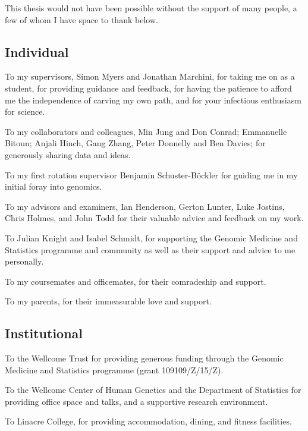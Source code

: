
This thesis would not have been possible without the support of many people, a few of whom I have space to thank below.

\subsection*{Individual}

To my supervisors, Simon Myers and Jonathan Marchini, for taking me on as a student, for providing guidance and feedback, for having the patience to afford me the independence of carving my own path, and for your infectious enthusiasm for science.

To my collaborators and colleagues, Min Jung and Don Conrad; Emmanuelle Bitoun; Anjali Hinch, Gang Zhang, Peter Donnelly and Ben Davies; for generously sharing data and ideas.

To my first rotation supervisor Benjamin Schuster-Böckler for guiding me in my initial foray into genomics.

To my advisors and examiners, Ian Henderson, Gerton Lunter, Luke Jostins, Chris Holmes, and John Todd for their valuable advice and feedback on my work.

To Julian Knight and Isabel Schmidt, for supporting the Genomic Medicine and Statistics programme and community as well as their support and advice to me personally.

To my coursemates and officemates, for their comradeship and support.

To my parents, for their immeasurable love and support.

\subsection*{Institutional}

To the Wellcome Trust for providing generous funding through the Genomic Medicine and Statistics programme (grant 109109/Z/15/Z).

To the Wellcome Center of Human Genetics and the Department of Statistics for providing office space and talks, and a supportive research environment.

To Linacre College, for providing accommodation, dining, and fitness facilities.
